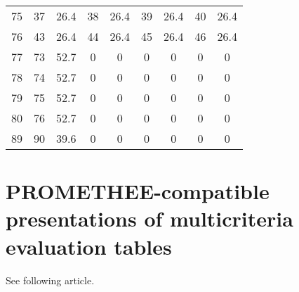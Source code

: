 \begin{center}
\begin{footnotesize}
\begin{tabular}{|c|cccccccc|}
75 & 37 & 26.4 & 38 & 26.4 & 39 & 26.4 & 40 & 26.4 \\
76 & 43 & 26.4 & 44 & 26.4 & 45 & 26.4 & 46 & 26.4 \\
77 & 73 & 52.7 & 0 & 0 & 0 & 0 & 0 & 0 \\
78 & 74 & 52.7 & 0 & 0 & 0 & 0 & 0 & 0 \\
79 & 75 & 52.7 & 0 & 0 & 0 & 0 & 0 & 0 \\
80 & 76 & 52.7 & 0 & 0 & 0 & 0 & 0 & 0 \\
89 & 90 & 39.6 & 0 & 0 & 0 & 0 & 0 & 0 \\
\hline
\end{tabular}
\end{footnotesize}
\end{center}

\clearpage
\section{PROMETHEE-compatible presentations of multicriteria evaluation tables}
\label{apdx:ijmcdm}
See following article.
